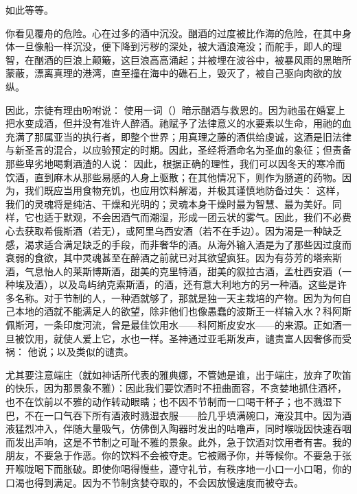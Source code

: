 如此等等。\par

你看见覆舟的危险。心在过多的酒中沉没。酗酒的过度被比作海的危险，在其中身体一旦像船一样沉没，便下降到污秽的深处，被大酒浪淹没；而舵手，即人的理智，在酗酒的巨浪上颠簸，这巨浪高高涌起；并被埋在波谷中，被暴风雨的黑暗所蒙蔽，漂离真理的港湾，直至撞在海中的礁石上，毁灭了，被自己驱向肉欲的放纵。\par

因此，宗徒有理由吩咐说： 使用一词（）暗示酗酒与救恩的。因为祂虽在婚宴上把水变成酒，但并没有准许人醉酒。祂赋予了法律意义的水要素以生命，用祂的血充满了那属亚当的执行者，即整个世界；用真理之藤的酒供给虔诚，这酒是旧法律与新圣言的混合，以应验预定的时期。因此，圣经将酒命名为圣血的象征；但责备那些卑劣地喝剩酒渣的人说：  因此，根据正确的理性，我们可以因冬天的寒冷而饮酒，直到麻木从那些易感的人身上驱散；在其他情况下，则作为肠道的药物。因为，我们既应当用食物充饥，也应用饮料解渴，并极其谨慎地防备过失： 这样，我们的灵魂将是纯洁、干燥和光明的；灵魂本身干燥时最为智慧、最为美好。同样，它也适于默观，不会因酒气而潮湿，形成一团云状的雾气。因此，我们不必费心去获取希俄斯酒（若无），或阿里乌西安酒（若不在手边）。因为渴是一种缺乏感，渴求适合满足缺乏的手段，而非奢华的酒。从海外输入酒是为了那些因过度而衰弱的食欲，其中灵魂甚至在醉酒之前就已对其欲望疯狂。因为有芬芳的塔索斯酒，气息怡人的莱斯博斯酒，甜美的克里特酒，甜美的叙拉古酒，孟杜西安酒（一种埃及酒），以及岛屿纳克索斯酒，的酒，还有意大利地方的另一种酒。这些是许多名称。对于节制的人，一种酒就够了，那就是独一天主栽培的产物。因为为何自己本地的酒就不能满足人的欲望，除非他们也像愚蠢的波斯王一样输入水？科阿斯佩斯河，一条印度河流，曾是最佳饮用水——科阿斯皮安水——的来源。正如酒一旦被饮用，就使人爱上它，水也一样。圣神通过亚毛斯发声，谴责富人因奢侈而受祸：  他说；以及类似的谴责。\par

尤其要注意端庄（就如神话所代表的雅典娜，不管她是谁，出于端庄，放弃了吹笛的快乐，因为那景象不雅）：因此我们要饮酒时不扭曲面容，不贪婪地抓住酒杯，也不在饮前以不雅的动作转动眼睛；也不因不节制而一口喝干杯子；也不溅湿下巴，不在一口气吞下所有酒液时溅湿衣服——脸几乎填满碗口，淹没其中。因为酒液猛烈冲入，伴随大量吸气，仿佛倒入陶器时发出的咕噜声，同时喉咙因快速吞咽而发出声响，这是不节制之可耻不雅的景象。此外，急于饮酒对饮用者有害。我的朋友，不要急于作恶。你的饮料不会被夺走。它被赐予你，并等候你。不要急于张开喉咙喝下而胀破。即使你喝得慢些，遵守礼节，有秩序地一小口一小口喝，你的口渴也得到满足。因为不节制贪婪夺取的，不会因放慢速度而被夺去。\par

